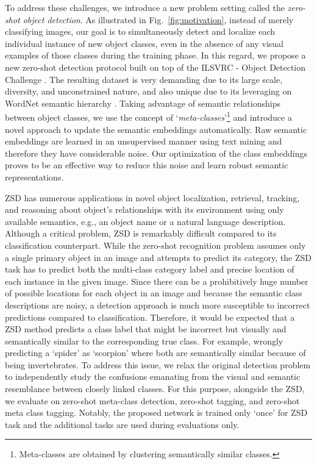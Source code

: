 \documentclass[runningheads]{llncs}
\begin{document}
To address these challenges, we introduce a new problem setting called the \emph{zero-shot object detection}. As illustrated in Fig.~\ref{fig:motivation}, instead of merely classifying images, our goal is to simultaneously detect and localize each individual instance of new object classes, even in the absence of any visual examples of those classes during the training phase. In this regard, we propose a new zero-shot detection protocol built on top of the ILSVRC - Object Detection Challenge \cite{ILSVRC_2015}. The resulting dataset is very demanding due to its large scale, diversity, and unconstrained nature, and also unique due to its leveraging on WordNet semantic hierarchy \cite{Wordnet_1995}. Taking advantage of semantic relationships between object classes, we use the concept of `\emph{meta-classes}'\footnote{Meta-classes are obtained by clustering semantically similar classes.} and introduce a novel approach to update the semantic embeddings automatically. Raw semantic embeddings are learned in an unsupervised manner using text mining and therefore they have considerable noise. Our optimization of the class embeddings proves to be an effective way to reduce this noise and learn robust semantic representations. 

ZSD has numerous applications in novel object localization, retrieval, tracking, and reasoning about object's relationships with its environment using only available semantics, e.g., an object name or a natural language description. Although a critical problem, ZSD is remarkably difficult compared to its classification counterpart. While the zero-shot recognition problem assumes only a single primary object in an image and attempts to predict its category, the ZSD task has to predict both the multi-class category label and precise location of each instance in the given image. Since there can be a prohibitively huge number of possible locations for each object in an image and because the semantic class descriptions are noisy, a detection approach is much more susceptible to incorrect predictions compared to classification. Therefore, it would be expected that a ZSD method predicts a class label that might be incorrect but visually and semantically similar to the corresponding true class. For example, wrongly predicting a `spider' as `scorpion' where both are semantically similar because of being invertebrates. To address this issue, we relax the original detection problem to independently study the confusions emanating from the visual and semantic resemblance between closely linked classes. For this purpose, alongside the ZSD, we evaluate on zero-shot meta-class detection, zero-shot tagging, and zero-shot meta class tagging.  Notably, the proposed network is trained only `once' for ZSD task and the additional tasks are used during evaluations only.
\end{document}
